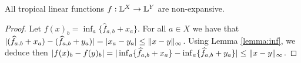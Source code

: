 \begin{proposition}\label{prop:troplinear}
All tropical linear functions $f: \mathbb{L}^{X}\to \mathbb{L}^{Y}$ are non-expansive.  
\end{proposition}
\begin{proof}
Let $f(x)_{b}=\inf_{a}\{\widehat f_{a,b}+x_{a}\}$.
For all $a\in X$ we have that 
$|(\widehat f_{a,b}+x_{a})- (\widehat f_{a,b}+y_{a})|=
|x_{a}-y_{a}|\leq \lVert x-y\rVert_{\infty}$. Using Lemma \ref{lemma:inf}, we deduce then 
$|f(x)_{b}-f(y)_{b}|=|\inf_{a}\{\widehat f_{a,b}+x_{a}\}-
\inf_{a}\{\widehat f_{a,b}+y_{a}\}|\leq \lVert x-y\rVert_{\infty}$.
\end{proof}






